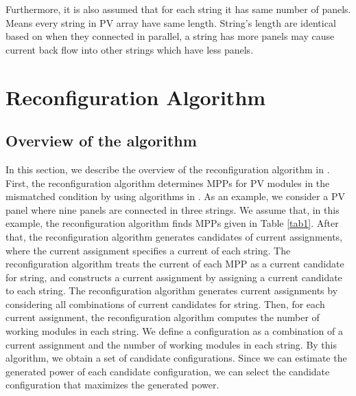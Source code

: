 \documentclass[conference]{IEEEtran}
\begin{document}
Furthermore, it is also assumed that for each string it has same number of panels. Means every string in PV array have same length. String's length are identical based on when they connected in parallel, a string has more panels may cause current back flow into other strings which have less panels\cite{b8}.

\section{Reconfiguration Algorithm} \label{algo}
\subsection{Overview of the algorithm}
In this section, we describe the overview of the reconfiguration algorithm in \cite{b10}. First, the reconfiguration algorithm determines MPPs for PV modules in the mismatched condition by using algorithms in \cite{b6}\cite{b7}\cite{b9}. As an example, we consider a PV panel where nine panels are connected in three strings. We assume that, in this example, the reconfiguration algorithm finds MPPs given in Table \ref{tab1}.
After that, the reconfiguration algorithm generates candidates of current assignments, where the current assignment specifies a current of each string. The reconfiguration algorithm treats the current of each MPP as a current candidate for string, and constructs a current assignment by assigning a current candidate to each string. The reconfiguration algorithm generates current assignments by considering all combinations of current candidates for string.
Then, for each current assignment, the reconfiguration algorithm computes the number of working modules in each string. We define a configuration as a combination of a current assignment and the number of working modules in each string. By this algorithm, we obtain a set of candidate configurations. Since we can estimate the generated power of each candidate configuration, we can select the candidate configuration that maximizes the generated power.
\end{document}

